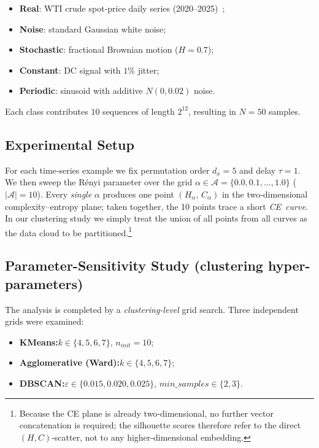 \documentclass{article}
\begin{document}
\begin{itemize}
\item \textbf{Real}: WTI crude spot‑price daily series (2020–2025)~\citep{EIA_WTI_DCOILWTICO};
\item \textbf{Noise}: standard Gaussian white noise;
\item \textbf{Stochastic}: fractional Brownian motion (\(H\!=\!0.7\));
\item \textbf{Constant}: DC signal with \(1\%\) jitter;
\item \textbf{Periodic}: sinusoid with additive \(N(0,0.02)\) noise.
\end{itemize}

Each class contributes \(10\) sequences of length \(2^{12}\),
resulting in \(N=50\) samples.

\subsection{Experimental Setup}\label{sec:setup}

For each time‑series example we fix permutation order \(d_x = 5\) and
delay \(\tau = 1\).  We then sweep the Rényi parameter over the grid
\(\alpha \in \mathcal{A} = \{0.0,0.1,\dots,1.0\}\) (\(|\mathcal{A}|=10\)).
Every \emph{single} \(\alpha\) produces one point
\((H_\alpha,\,C_\alpha)\) in the two‑dimensional complexity–entropy
plane; taken together, the 10 points trace a short \emph{CE curve}.  In
our clustering study we simply treat the union of all points from all
curves as the data cloud to be partitioned.\footnote{Because the CE
plane is already two‑dimensional, no further vector concatenation is
required; the silhouette scores therefore refer to the direct
\((H,C)\)-scatter, not to any higher‑dimensional embedding.}

\subsection{Parameter-Sensitivity Study (clustering hyper-parameters)}
\label{sec:grid}

The analysis is completed by a
\emph{clustering-level} grid search.  Three independent grids were
examined:

\begin{itemize}
\item \textbf{KMeans:}\;$k\in\{4,5,6,7\}$,\; $n_{\textit{init}}=10$;
\item \textbf{Agglomerative (Ward):}\;$k\in\{4,5,6,7\}$;
\item \textbf{DBSCAN:}\;$\varepsilon\in\{0.015,0.020,0.025\}$,\;
      $\textit{min\_samples}\in\{2,3\}$.
\end{itemize}
\end{document}
